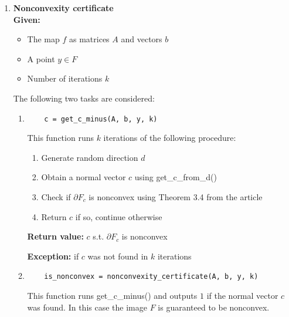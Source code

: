 \documentclass[a4paper]{article}
\theoremstyle{definition}
\begin{document}
\begin{enumerate}
\begin{enumerate}
{\bf Exception:} if optimization task failed, in particular, if $y\notin G$.

\item \begin{verbatim}
c = get_c_from_d(A, b, y, d)
\end{verbatim}

This function obtains the normal vector $c$ at the boundary point $y+td$ using dual problem (5) from the article.

{\bf Return value:} the normal vector $c$ s.t. $y+td\in\partial G_c$

{\bf Exception:} if optimization task failed, in particular, if $y\notin G$.
\end{enumerate}

\item {\bf Nonconvexity certificate}\\
{\bf Given:}
\begin{itemize}
	\item The map $f$ as matrices $A$ and vectors $b$
	\item A point $y\in F$
	\item Number of iterations $k$
\end{itemize}
The following two tasks are considered:
\begin{enumerate}
	\item \begin{verbatim}
	c = get_c_minus(A, b, y, k)
	\end{verbatim}
	This function runs $k$ iterations of the following procedure:
	\begin{enumerate}
		\item Generate random direction $d$
		\item Obtain a normal vector $c$ using get\_c\_from\_d()
		\item Check if $\partial F_c$ is nonconvex using Theorem 3.4 from the article
		\item Return $c$ if so, continue otherwise
	\end{enumerate}

	{\bf Return value:}  $c$ s.t. $\partial F_c$ is nonconvex
	
	{\bf Exception:} if $c$ was not found in $k$ iterations
	
	\item \begin{verbatim}
	is_nonconvex = nonconvexity_certificate(A, b, y, k)
	\end{verbatim}
	
	This function runs get\_c\_minus() and outputs $1$ if the normal vector $c$ was found. In this case the image $F$ is guaranteed to be nonconvex.
	

\end{enumerate}
\end{enumerate}
\end{document}
